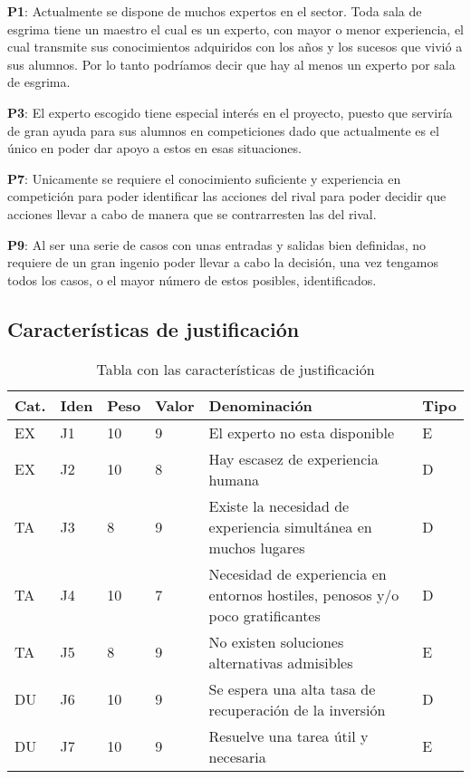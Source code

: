 \begin{compactitem}
  \item[\textbf{P1}:] Actualmente se dispone de muchos expertos en el sector. Toda sala de esgrima
     tiene un maestro el cual es un experto, con mayor o menor experiencia, el cual transmite
     sus conocimientos adquiridos con los años y los sucesos que vivió a sus alumnos. Por lo tanto
     podríamos decir que hay al menos un experto por sala de esgrima.
  \item[\textbf{P3}:] El experto escogido tiene especial interés en el proyecto, puesto que
     serviría de gran ayuda para sus alumnos en competiciones dado que actualmente es el único
     en poder dar apoyo a estos en esas situaciones.
  \item[\textbf{P7}:] Unicamente se requiere el conocimiento suficiente y experiencia en competición
     para poder identificar las acciones del rival para poder decidir que acciones llevar a cabo
     de manera que se contrarresten las del rival.
  \item[\textbf{P9}:] Al ser una serie de casos con unas entradas y salidas bien definidas, no requiere
     de un gran ingenio poder llevar a cabo la decisión, una vez tengamos todos los casos, o el mayor
     número de estos posibles, identificados.
\end{compactitem}


\subsection{Características de justificación}
\begin{table}[htb]%
  \centering
  \caption{Tabla con las características de justificación}
  \label{tab:anchura}
  \begin{tabular}{ | l | l | l | l | p{8cm} | l | }
    \hline
    Cat. & Iden & Peso & Valor & Denominación & Tipo \\ \hline
    EX & J1 & 10 & 9 & El experto no esta disponible & E \\ \hline
    EX & J2 & 10 & 8 & Hay escasez de experiencia humana & D \\ \hline
    TA & J3 & 8 & 9 & Existe la necesidad de experiencia simultánea en muchos lugares & D \\ \hline
    TA & J4 & 10 & 7 & Necesidad de experiencia en entornos hostiles, penosos y/o poco gratificantes & D \\ \hline
    TA & J5 & 8 & 9 & No existen soluciones alternativas admisibles & E \\ \hline
    DU & J6 & 10 & 9 & Se espera una alta tasa de recuperación de la inversión & D \\ \hline
    DU & J7 & 10 & 9 & Resuelve una tarea útil y necesaria & E \\ \hline
   \end{tabular}
\end{table}

